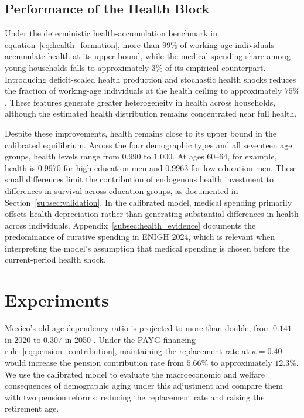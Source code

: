 \documentclass[12pt,a4paper]{article}
\begin{document}
\subsection{Performance of the Health Block}
\label{subsec:health_block_evidence}

Under the deterministic health-accumulation benchmark in equation~\eqref{eq:health_formation}, more than $99\%$ of working-age individuals accumulate health at its upper bound, while the medical-spending share among young households falls to approximately $3\%$ of its empirical counterpart. Introducing deficit-scaled health production and stochastic health shocks reduces the fraction of working-age individuals at the health ceiling to approximately $75\%$. These features generate greater heterogeneity in health across households, although the estimated health distribution remains concentrated near full health.

Despite these improvements, health remains close to its upper bound in the calibrated equilibrium. Across the four demographic types and all seventeen age groups, health levels range from $0.990$ to $1.000$. At ages 60--64, for example, health is $0.9970$ for high-education men and $0.9963$ for low-education men. These small differences limit the contribution of endogenous health investment to differences in survival across education groups, as documented in Section~\ref{subsec:validation}. In the calibrated model, medical spending primarily offsets health depreciation rather than generating substantial differences in health across individuals. Appendix~\ref{subsec:health_evidence} documents the predominance of curative spending in ENIGH 2024, which is relevant when interpreting the model's assumption that medical spending is chosen before the current-period health shock.


\section{Experiments}
\label{sec:experiments}

Mexico's old-age dependency ratio is projected to more than double, from $0.141$ in 2020 to $0.307$ in 2050 \citep{CONAPO2023}. Under the PAYG financing rule~\eqref{eq:pension_contribution}, maintaining the replacement rate at $\kappa=0.40$ would increase the pension contribution rate from $5.66\%$ to approximately $12.3\%$. We use the calibrated model to evaluate the macroeconomic and welfare consequences of demographic aging under this adjustment and compare them with two pension reforms: reducing the replacement rate and raising the retirement age.
\end{document}
